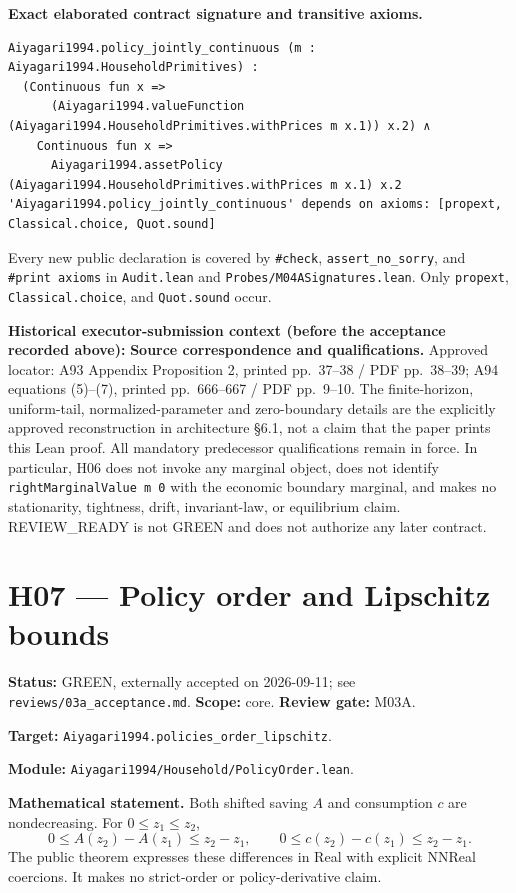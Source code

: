 \documentclass[
  11pt,
]{article}
\let\LedgerOriginalTexttt\texttt
\renewcommand{\texttt}[1]{{\small\LedgerOriginalTexttt{#1}}}
\begin{document}
\textbf{Exact elaborated contract signature and transitive axioms.}

\begin{verbatim}
Aiyagari1994.policy_jointly_continuous (m : Aiyagari1994.HouseholdPrimitives) :
  (Continuous fun x =>
      (Aiyagari1994.valueFunction (Aiyagari1994.HouseholdPrimitives.withPrices m x.1)) x.2) ∧
    Continuous fun x =>
      Aiyagari1994.assetPolicy (Aiyagari1994.HouseholdPrimitives.withPrices m x.1) x.2
'Aiyagari1994.policy_jointly_continuous' depends on axioms: [propext, Classical.choice, Quot.sound]
\end{verbatim}

Every new public declaration is covered by \texttt{\#check},
\texttt{assert\_no\_sorry}, and \texttt{\#print\ axioms} in
\texttt{Audit.lean} and \texttt{Probes/M04ASignatures.lean}. Only
\texttt{propext}, \texttt{Classical.choice}, and \texttt{Quot.sound}
occur.

\textbf{Historical executor-submission context (before the acceptance
recorded above):} \textbf{Source correspondence and qualifications.}
Approved locator: A93 Appendix Proposition 2, printed pp.~37--38 / PDF
pp.~38--39; A94 equations (5)--(7), printed pp.~666--667 / PDF
pp.~9--10. The finite-horizon, uniform-tail, normalized-parameter and
zero-boundary details are the explicitly approved reconstruction in
architecture §6.1, not a claim that the paper prints this Lean proof.
All mandatory predecessor qualifications remain in force. In particular,
H06 does not invoke any marginal object, does not identify
\texttt{rightMarginalValue\ m\ 0} with the economic boundary marginal,
and makes no stationarity, tightness, drift, invariant-law, or
equilibrium claim. REVIEW\_READY is not GREEN and does not authorize any
later contract.

\section{H07 --- Policy order and Lipschitz
bounds}\label{h07-policy-order-and-lipschitz-bounds}

\textbf{Status:} GREEN, externally accepted on 2026-09-11; see
\texttt{reviews/03a\_acceptance.md}. \textbf{Scope:} core.
\textbf{Review gate:} M03A.

\textbf{Target:} \texttt{Aiyagari1994.policies\_order\_lipschitz}.

\textbf{Module:} \texttt{Aiyagari1994/Household/PolicyOrder.lean}.

\textbf{Mathematical statement.} Both shifted saving \(A\) and
consumption \(c\) are nondecreasing. For \(0\leq z_1\leq z_2\),
\[0\leq A(z_2)-A(z_1)\leq z_2-z_1,\qquad 0\leq c(z_2)-c(z_1)\leq z_2-z_1.\]
The public theorem expresses these differences in Real with explicit
NNReal coercions. It makes no strict-order or policy-derivative claim.
\end{document}
